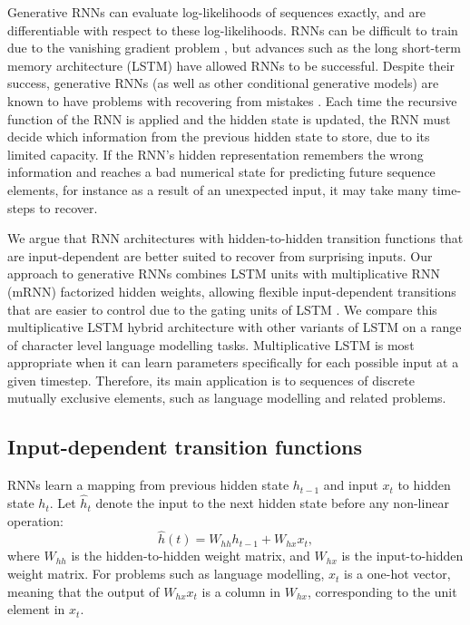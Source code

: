 \documentclass{article}
\begin{document}
Generative RNNs can evaluate log-likelihoods of sequences exactly, and are  differentiable with respect to these log-likelihoods. RNNs can be difficult to train due to the vanishing gradient problem \citep{Bengio-1994}, but advances such as the long short-term memory architecture (LSTM) \citep{Hochreiter-1997} have allowed RNNs to be successful. Despite their success, generative RNNs (as well as other conditional generative models) are known to have problems with recovering from mistakes \citep{Graves-2013}. Each time the recursive function of the RNN is applied and the hidden state is updated, the RNN must decide which information from the previous hidden state to store, due to its limited capacity. If the RNN's hidden representation remembers the wrong information and reaches a bad numerical state for predicting future sequence elements, for instance as a result of an unexpected input, it may take many time-steps to recover.    


We argue that RNN architectures with hidden-to-hidden transition functions that are input-dependent are better suited to recover from surprising inputs. Our approach to generative RNNs combines LSTM units with multiplicative RNN (mRNN) factorized hidden weights, allowing flexible input-dependent transitions that are easier to control due to the gating units of LSTM \@. We compare this multiplicative LSTM hybrid architecture with other variants of LSTM on a range of character level language modelling tasks. Multiplicative LSTM is most appropriate when it can learn parameters specifically for each possible input at a given timestep. Therefore, its main application is to sequences of discrete mutually exclusive elements, such as language modelling and related problems.

\subsection{Input-dependent transition functions}

RNNs learn a mapping from previous hidden state $h_{t-1}$ and input $x_t$ to hidden state $h_t$. Let $\hat{h}_t$ denote the input to the next hidden state before any non-linear operation:
\begin{equation}
\hat{h}(t) = W_{hh}h_{t-1} + W_{hx}x_{t}  ,
\end{equation}
where  $W_{hh}$ is the hidden-to-hidden weight matrix, and $W_{hx}$ is the input-to-hidden weight matrix. For problems such as language modelling, $x_t$ is a one-hot vector, meaning that the output of $W_{hx}x_{t}$ is a column in $W_{hx}$, corresponding to the unit element in $x_{t}$.
\end{document}
